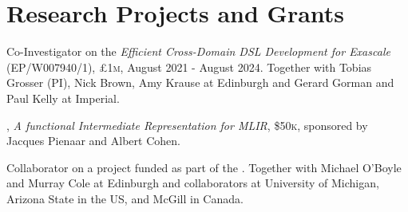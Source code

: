 \section{Research Projects and Grants}
\begin{cvitemize}
    \item Co-Investigator on the  \emph{Efficient Cross-Domain DSL Development for Exascale} (EP/W007940/1), £1\textsc{m}, August 2021 - August 2024.
    Together with Tobias Grosser (PI), Nick Brown, Amy Krause at Edinburgh and Gerard Gorman and Paul Kelly at Imperial.
\end{cvitemize}
\begin{cvitemize}
    \item {}, \textit{A functional Intermediate Representation for MLIR}, \$50\textsc{k}, sponsored by Jacques Pienaar and Albert Cohen.%
\end{cvitemize}
\begin{cvitemize}
    \item Collaborator on a project funded as part of the .
    Together with Michael O'Boyle and Murray Cole at Edinburgh and collaborators at University of Michigan, Arizona State in the US, and McGill in Canada.
\end{cvitemize}
